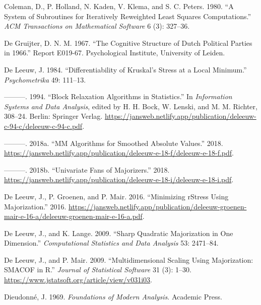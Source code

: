 \documentclass[
  12pt,
  letterpaper,
  DIV=11,
  numbers=noendperiod]{scrartcl}
\newlength{\cslhangindent}
\newenvironment{CSLReferences}[2] %
 {\begin{list}{}{%
  \setlength{\itemindent}{0pt}
  \setlength{\leftmargin}{0pt}
  \setlength{\parsep}{0pt}
  \ifodd #1
   \setlength{\leftmargin}{\cslhangindent}
   \setlength{\itemindent}{-1\cslhangindent}
  \fi
  \setlength{\itemsep}{#2\baselineskip}}}
 {\end{list}}
\theoremstyle{plain}
\theoremstyle{plain}
\theoremstyle{plain}
\theoremstyle{definition}
\theoremstyle{remark}
\begin{document}
\begin{CSLReferences}{1}{0}
Coleman, D., P. Holland, N. Kaden, V. Klema, and S. C. Peters. 1980.
{``A System of Subroutines for Iteratively Reweighted Least Squares
Computations.''} \emph{ACM Transactions on Mathematical Software} 6 (3):
327--36.

De Gruijter, D. N. M. 1967. {``{The Cognitive Structure of Dutch
Political Parties in 1966}.''} Report E019-67. Psychological Institute,
University of Leiden.

De Leeuw, J. 1984. {``{Differentiability of Kruskal's Stress at a Local
Minimum}.''} \emph{Psychometrika} 49: 111--13.

---------. 1994. {``{Block Relaxation Algorithms in Statistics}.''} In
\emph{Information Systems and Data Analysis}, edited by H. H. Bock, W.
Lenski, and M. M. Richter, 308--24. Berlin: Springer Verlag.
\url{https://jansweb.netlify.app/publication/deleeuw-c-94-c/deleeuw-c-94-c.pdf}.

---------. 2018a. {``{MM Algorithms for Smoothed Absolute Values}.''}
2018.
\url{https://jansweb.netlify.app/publication/deleeuw-e-18-f/deleeuw-e-18-f.pdf}.

---------. 2018b. {``{Univariate Fans of Majorizers}.''} 2018.
\url{https://jansweb.netlify.app/publication/deleeuw-e-18-i/deleeuw-e-18-i.pdf}.

De Leeuw, J., P. Groenen, and P. Mair. 2016. {``{Minimizing rStress
Using Majorization}.''} 2016.
\url{https://jansweb.netlify.app/publication/deleeuw-groenen-mair-e-16-a/deleeuw-groenen-mair-e-16-a.pdf}.

De Leeuw, J., and K. Lange. 2009. {``Sharp Quadratic Majorization in One
Dimension.''} \emph{Computational Statistics and Data Analysis} 53:
2471--84.

De Leeuw, J., and P. Mair. 2009. {``{Multidimensional Scaling Using
Majorization: SMACOF in R}.''} \emph{Journal of Statistical Software} 31
(3): 1--30. \url{https://www.jstatsoft.org/article/view/v031i03}.

Dieudonné, J. 1969. \emph{Foundations of Modern Analysis}. Academic
Press.


\end{CSLReferences}
\end{document}
